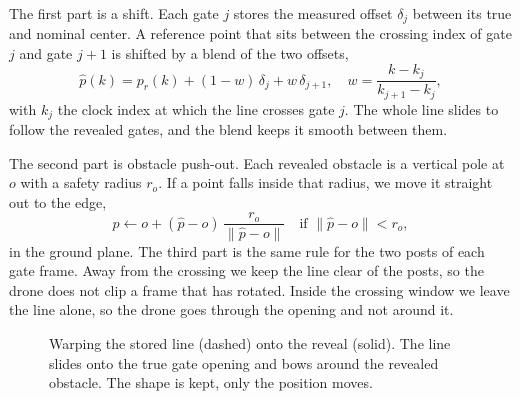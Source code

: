 \documentclass[conference]{IEEEtran}
\begin{document}
The first part is a shift. Each gate $j$ stores the measured offset $\delta_j$ between its true and nominal center. A reference point that sits between the crossing index of gate $j$ and gate $j{+}1$ is shifted by a blend of the two offsets,
\begin{equation}
\hat p(k) = p_r(k) + (1-w)\,\delta_j + w\,\delta_{j+1}, \quad w = \frac{k - k_j}{k_{j+1} - k_j},
\label{eq:blend}
\end{equation}
with $k_j$ the clock index at which the line crosses gate $j$. The whole line slides to follow the revealed gates, and the blend keeps it smooth between them.

The second part is obstacle push-out. Each revealed obstacle is a vertical pole at $o$ with a safety radius $r_o$. If a point falls inside that radius, we move it straight out to the edge,
\begin{equation}
\hat p \leftarrow o + (\hat p - o)\,\frac{r_o}{\lVert \hat p - o \rVert} \quad \text{if } \lVert \hat p - o \rVert < r_o,
\label{eq:pushout}
\end{equation}
in the ground plane. The third part is the same rule for the two posts of each gate frame. Away from the crossing we keep the line clear of the posts, so the drone does not clip a frame that has rotated. Inside the crossing window we leave the line alone, so the drone goes through the opening and not around it.

\begin{figure}[t]
\centering
{}
\caption{Warping the stored line (dashed) onto the reveal (solid). The line slides onto the true gate opening and bows around the revealed obstacle. The shape is kept, only the position moves.}
\label{fig:warp}
\end{figure}
\end{document}
